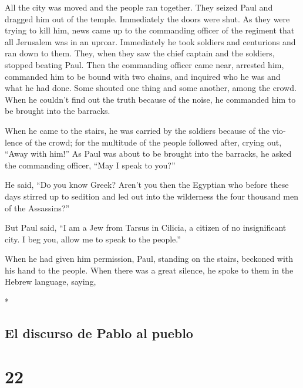 \begin{paracol}{2}
\begin{otherlanguage}{english}
 All the city was moved and the people ran together. They
seized Paul and dragged him out of the temple. Immediately the doors
were shut.  As they were trying to kill him, news came up
to the commanding officer of the regiment that all Jerusalem was in an
uproar.  Immediately he took soldiers and centurions and
ran down to them. They, when they saw the chief captain and the
soldiers, stopped beating Paul.  Then the commanding
officer came near, arrested him, commanded him to be bound with two
chains, and inquired who he was and what he had done. 
Some shouted one thing and some another, among the crowd. When he
couldn't find out the truth because of the noise, he commanded him to be
brought into the barracks.

 When he came to the stairs, he was carried by the
soldiers because of the violence of the crowd;  for the
multitude of the people followed after, crying out, ``Away with him!''
 As Paul was about to be brought into the barracks, he
asked the commanding officer, ``May I speak to you?''

He said, ``Do you know Greek?  Aren't you then the
Egyptian who before these days stirred up to sedition and led out into
the wilderness the four thousand men of the Assassins?''

 But Paul said, ``I am a Jew from Tarsus in Cilicia, a
citizen of no insignificant city. I beg you, allow me to speak to the
people.''

 When he had given him permission, Paul, standing on the
stairs, beckoned with his hand to the people. When there was a great
silence, he spoke to them in the Hebrew language, saying,

\end{otherlanguage}

\switchcolumn[0]*

\hypertarget{el-discurso-de-pablo-al-pueblo}{%
\subsection{El discurso de Pablo al
pueblo}\label{el-discurso-de-pablo-al-pueblo}}

\hypertarget{section-42}{%
\section{22}\label{section-42}}


\end{paracol}
